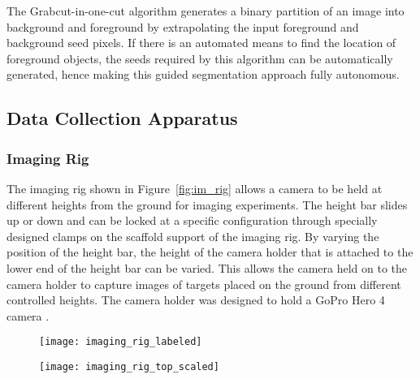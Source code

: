 The Grabcut-in-one-cut algorithm generates a binary partition of an image into background and foreground by extrapolating the input foreground and background seed pixels. If there is an automated means to find the location of foreground objects, the seeds required by this algorithm can be automatically generated, hence making this guided segmentation approach fully autonomous.

\subsection{Data Collection Apparatus}

\subsubsection{Imaging Rig}
\label{sec:imaging_rig}

The imaging rig shown in Figure~\ref{fig:im_rig} allows a camera to be held at different heights from the ground for imaging experiments. The height bar slides up or down and can be locked at a specific configuration through specially designed clamps on the scaffold support of the imaging rig. By varying the position of the height bar, the height of the camera holder that is attached to the lower end of the height bar can be varied. This allows the camera held on to the camera holder to capture images of targets placed on the ground from different controlled heights. The camera holder was designed to hold a GoPro Hero 4 camera \cite{gopro}.
	
\begin{figure*}
  \centering
  \begin{subfigure}[]{0.45\textwidth}
      \texttt{[image: imaging\_rig\_labeled]}
      \caption{}
      \label{fig:im_rig_side}
  \end{subfigure}
  \begin{subfigure}[]{0.45\textwidth}
      \texttt{[image: imaging\_rig\_top\_scaled]}
      \caption{}
      \label{fig:im_rig_top}
  \end{subfigure}
\caption[Imaging rig used for data collection in multi-image object recognition approach]{The imaging rig allows the height bar to slide up or down, thereby letting the height of the camera from the ground to be varied. The different components of the imaging rig are labeled in (). The camera holder attached to the lower end of the height bar is designed to carry a GoPro Hero 4 camera.}
\label{fig:im_rig}
\end{figure*}	


